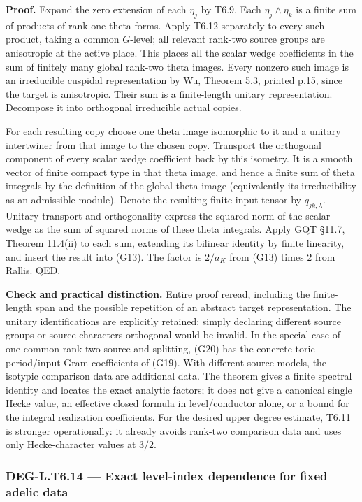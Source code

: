 \documentclass[11pt,a4paper]{article}
\theoremstyle{definition}
\begin{document}
\textbf{Proof.} Expand the zero extension of each \(\eta_j\) by T6.9. Each \(\eta_j\wedge\eta_k\) is a finite sum of products of rank-one theta forms. Apply T6.12 separately to every such product, taking a common \(G\)-level; all relevant rank-two source groups are anisotropic at the active place. This places all the scalar wedge coefficients in the sum of finitely many global rank-two theta images. Every nonzero such image is an irreducible cuspidal representation by Wu, Theorem 5.3, printed p.15, since the target is anisotropic. Their sum is a finite-length unitary representation. Decompose it into orthogonal irreducible actual copies.

For each resulting copy choose one theta image isomorphic to it and a unitary intertwiner from that image to the chosen copy. Transport the orthogonal component of every scalar wedge coefficient back by this isometry. It is a smooth vector of finite compact type in that theta image, and hence a finite sum of theta integrals by the definition of the global theta image (equivalently its irreducibility as an admissible module). Denote the resulting finite input tensor by \(q_{jk,\lambda}\). Unitary transport and orthogonality express the squared norm of the scalar wedge as the sum of squared norms of these theta integrals. Apply GQT §11.7, Theorem 11.4(ii) to each sum, extending its bilinear identity by finite linearity, and insert the result into (G13). The factor is \(2/a_K\) from (G13) times \(2\) from Rallis. QED.

\textbf{Check and practical distinction.} Entire proof reread, including the finite-length span and the possible repetition of an abstract target representation. The unitary identifications are explicitly retained; simply declaring different source groups or source characters orthogonal would be invalid. In the special case of one common rank-two source and splitting, (G20) has the concrete toric-period/input Gram coefficients of (G19). With different source models, the isotypic comparison data are additional data. The theorem gives a finite spectral identity and locates the exact analytic factors; it does not give a canonical single Hecke value, an effective closed formula in level/conductor alone, or a bound for the integral realization coefficients. For the desired upper degree estimate, T6.11 is stronger operationally: it already avoids rank-two comparison data and uses only Hecke-character values at \(3/2\).

\subsubsection{DEG-L.T6.14 --- Exact level-index dependence for fixed adelic data}\label{DEG-L.T6.14}
\end{document}
